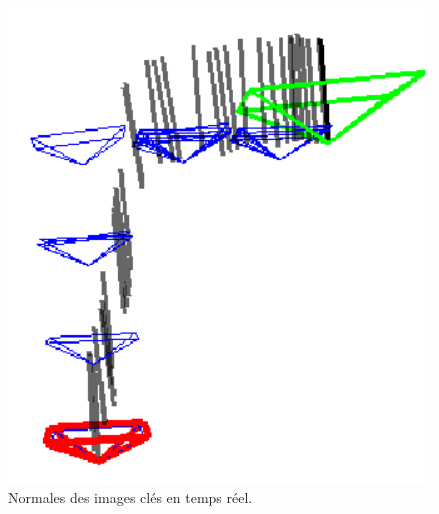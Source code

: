 \documentclass[11pt]{article}
\begin{document}
\begin{figure}[!tbp]
\begin{minipage}[t]{0.4\textwidth}
            \includegraphics[width=\textwidth]{Test2.png}    
            \caption{Normales des images clés en temps réel.}
            \label{fig:Test2}
          \end{minipage}
        \end{figure}
\end{document}
